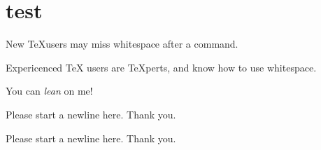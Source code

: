 \documentclass[12pt]{article}
\begin{document}
\section{test}

New \TeX users may miss whitespace after a command. %

Expericenced \TeX{} users are \TeX perts, and know how to use whitespace. %




You can \textsl{lean} on me!

Please start a newline here.\newline
Thank you.


Please start a newline here.
Thank you. %
\end{document}
